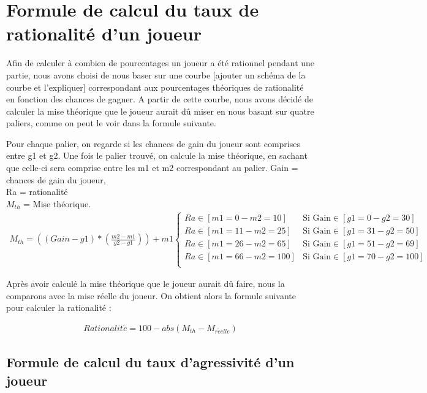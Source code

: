 \documentclass{report}
\begin{document}
\section{Formule de calcul du taux de rationalité d'un joueur}

Afin de calculer à combien de pourcentages un joueur a été rationnel pendant une partie, nous avons choisi de nous baser sur une courbe [ajouter un schéma de la courbe et l'expliquer] correspondant aux pourcentages théoriques de rationalité en fonction des chances de gagner. A partir de cette courbe, nous avons décidé de calculer la mise théorique que le joueur aurait dû miser en nous basant sur quatre paliers, comme on peut le voir dans la formule suivante. \par
Pour chaque palier, on regarde si les chances de gain du joueur sont comprises entre g1 et g2. Une fois le palier trouvé, on calcule la mise théorique, en sachant que celle-ci sera comprise entre les m1 et m2 correspondant au palier. 
	Gain = chances de gain du joueur,\\
	Ra = rationalité\\
	$M_{th}$ = Mise théorique.\\

\small{
\begin{align*}
	M_{th} = \left((Gain - g1) * \left(\frac{m2-m1}{g2-g1}\right)\right)+m1
	\begin{cases}
		Ra \in [m1=0 - m2=10] &\text{Si Gain} \in [g1=0 - g2=30]\\
		Ra \in [m1=11 - m2=25] &\text{Si Gain} \in [g1=31 - g2=50]\\
		Ra \in [m1=26 - m2=65] &\text{Si Gain} \in [g1=51 - g2=69]\\
		Ra \in [m1=66 - m2=100] &\text{Si Gain} \in [g1=70 - g2=100]\\
	\end{cases}
\end{align*}
}

Après avoir calculé la mise théorique que le joueur aurait dû faire, nous la comparons avec la mise réelle du joueur. On obtient alors la formule suivante pour calculer la rationalité : 

\begin{align*}
Rationalit\acute{e} = 100-abs(M_{th}-M_{r\acute{e}elle})
\end{align*}

\subsection{Formule de calcul du taux d'agressivité d'un joueur}
\end{document}
